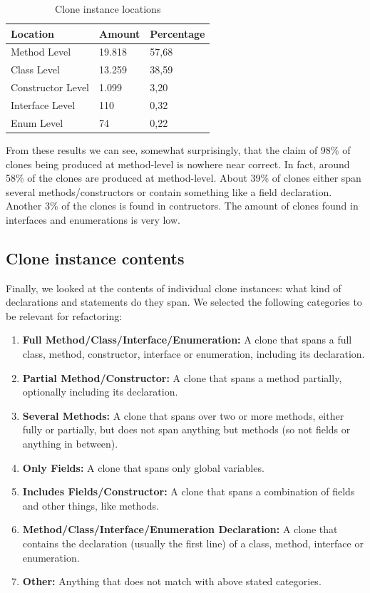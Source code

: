 \documentclass[a4paper]{article}
\begin{document}
\begin{table}[H]
  \begin{center}
  \caption{Clone instance locations} \label{table:locations}
  \bigskip
\begin{tabular}{|l|l|l|}
\hline
\textbf{Location}  & \textbf{Amount}  & \textbf{Percentage} \\ \hline
Method Level       & 19.818           & 57,68               \\ \hline
Class Level        & 13.259           & 38,59               \\ \hline
Constructor Level  & 1.099            & 3,20                \\ \hline
Interface Level    & 110              & 0,32                \\ \hline
Enum Level         & 74               & 0,22                \\ \hline
\end{tabular}
\end{center}
\end{table}

From these results we can see, somewhat surprisingly, that the claim of 98\% of clones being produced at method-level is nowhere near correct. In fact, around 58\% of the clones are produced at method-level. About 39\% of clones either span several methods/constructors or contain something like a field declaration. Another 3\% of the clones is found in contructors. The amount of clones found in interfaces and enumerations is very low.

\subsection{Clone instance contents}
Finally, we looked at the contents of individual clone instances: what kind of declarations and statements do they span. We selected the following categories to be relevant for refactoring:
\begin{enumerate}
  \item \textbf{Full Method/Class/Interface/Enumeration:} A clone that spans a full class, method, constructor, interface or enumeration, including its declaration.
  \item \textbf{Partial Method/Constructor:} A clone that spans a method partially, optionally including its declaration.
  \item \textbf{Several Methods:} A clone that spans over two or more methods, either fully or partially, but does not span anything but methods (so not fields or anything in between).
  \item \textbf{Only Fields:} A clone that spans only global variables.
  \item \textbf{Includes Fields/Constructor:} A clone that spans a combination of fields and other things, like methods.
  \item \textbf{Method/Class/Interface/Enumeration Declaration:} A clone that contains the declaration (usually the first line) of a class, method, interface or enumeration.
  \item \textbf{Other:} Anything that does not match with above stated categories.
\end{enumerate}
\end{document}

